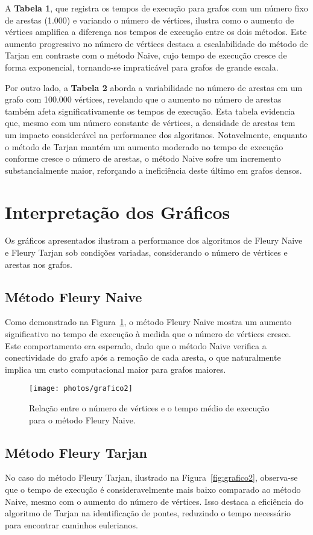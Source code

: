 \documentclass[12pt]{article}
\begin{document}
A \textbf{Tabela 1}, que registra os tempos de execução para grafos com um número fixo de arestas (1.000) e variando o número de vértices, ilustra como o aumento de vértices amplifica a diferença nos tempos de execução entre os dois métodos. Este aumento progressivo no número de vértices destaca a escalabilidade do método de Tarjan em contraste com o método Naive, cujo tempo de execução cresce de forma exponencial, tornando-se impraticável para grafos de grande escala.

Por outro lado, a \textbf{Tabela 2} aborda a variabilidade no número de arestas em um grafo com 100.000 vértices, revelando que o aumento no número de arestas também afeta significativamente os tempos de execução. Esta tabela evidencia que, mesmo com um número constante de vértices, a densidade de arestas tem um impacto considerável na performance dos algoritmos. Notavelmente, enquanto o método de Tarjan mantém um aumento moderado no tempo de execução conforme cresce o número de arestas, o método Naive sofre um incremento substancialmente maior, reforçando a ineficiência deste último em grafos densos.


\section{Interpretação dos Gráficos}
Os gráficos apresentados ilustram a performance dos algoritmos de Fleury Naive e Fleury Tarjan sob condições variadas, considerando o número de vértices e arestas nos grafos.

\subsection{Método Fleury Naive}
Como demonstrado na Figura~\ref{fig:grafico1}, o método Fleury Naive mostra um aumento significativo no tempo de execução à medida que o número de vértices cresce. Este comportamento era esperado, dado que o método Naive verifica a conectividade do grafo após a remoção de cada aresta, o que naturalmente implica um custo computacional maior para grafos maiores.

\begin{figure}[H]
    \centering
    \texttt{[image: photos/grafico2]}
    \caption{Relação entre o número de vértices e o tempo médio de execução para o método Fleury Naive.}
    \label{fig:grafico1}
\end{figure}

\subsection{Método Fleury Tarjan}
No caso do método Fleury Tarjan, ilustrado na Figura~\ref{fig:grafico2}, observa-se que o tempo de execução é consideravelmente mais baixo comparado ao método Naive, mesmo com o aumento do número de vértices. Isso destaca a eficiência do algoritmo de Tarjan na identificação de pontes, reduzindo o tempo necessário para encontrar caminhos eulerianos.
\end{document}

